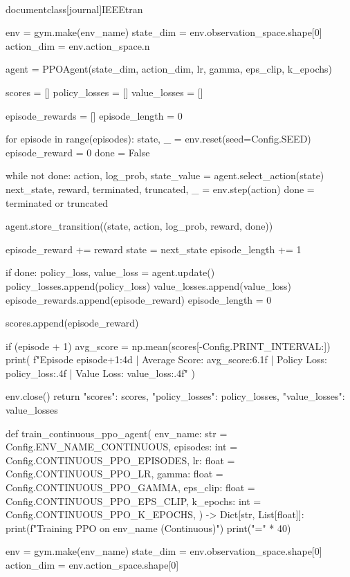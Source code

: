 \\documentclass[journal]{IEEEtran}
\begin{document}
    env = gym.make(env_name)
    state_dim = env.observation_space.shape[0]
    action_dim = env.action_space.n

    agent = PPOAgent(state_dim, action_dim, lr, gamma, eps_clip, k_epochs)

    scores = []
    policy_losses = []
    value_losses = []

    episode_rewards = []
    episode_length = 0

    for episode in range(episodes):
        state, _ = env.reset(seed=Config.SEED)
        episode_reward = 0
        done = False

        while not done:
            action, log_prob, state_value = agent.select_action(state)
            next_state, reward, terminated, truncated, _ = env.step(action)
            done = terminated or truncated

            agent.store_transition((state, action, log_prob, reward, done))

            episode_reward += reward
            state = next_state
            episode_length += 1

            if done:
                policy_loss, value_loss = agent.update()
                policy_losses.append(policy_loss)
                value_losses.append(value_loss)
                episode_rewards.append(episode_reward)
                episode_length = 0

        scores.append(episode_reward)

        if (episode + 1) %
            avg_score = np.mean(scores[-Config.PRINT_INTERVAL:])
            print(
                f"Episode {episode+1:4d} | Average Score: {avg_score:6.1f} | Policy Loss: {policy_loss:.4f} | Value Loss: {value_loss:.4f}"
            )

    env.close()
    return {"scores": scores, "policy_losses": policy_losses, "value_losses": value_losses}


def train_continuous_ppo_agent(
    env_name: str = Config.ENV_NAME_CONTINUOUS,
    episodes: int = Config.CONTINUOUS_PPO_EPISODES,
    lr: float = Config.CONTINUOUS_PPO_LR,
    gamma: float = Config.CONTINUOUS_PPO_GAMMA,
    eps_clip: float = Config.CONTINUOUS_PPO_EPS_CLIP,
    k_epochs: int = Config.CONTINUOUS_PPO_K_EPOCHS,
) -> Dict[str, List[float]]:
    print(f"Training PPO on {env_name} (Continuous)")
    print("=" * 40)

    env = gym.make(env_name)
    state_dim = env.observation_space.shape[0]
    action_dim = env.action_space.shape[0]
\end{document}
